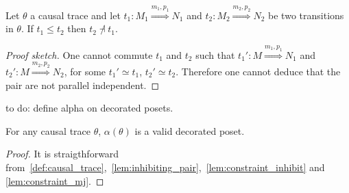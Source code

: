 \begin{lemma}
  \label{lem:constraint_inhibit}
  Let $\theta$ a causal trace and let $t_1:M_1\overset{m_1,p_1}{\Rightarrow}N_1$ and $t_2:M_2\overset{m_2,p_2}{\Rightarrow}N_2$ be two transitions in $\theta$.
  If $t_1 \leq t_2$ then $t_2\not\dashv t_1$.
\end{lemma}
\begin{proof}[Proof sketch]
  One cannot commute $t_1$ and $t_2$ such that $t_1':M\overset{m_1,p_1}{\Rightarrow}N_1$ and $t_2':M\overset{m_2,p_2}{\Rightarrow}N_2$, for some $t_1'\simeq t_1$, $t_2'\simeq t_2$. Therefore one cannot deduce that the pair are not parallel independent.
\end{proof}


\begin{mdframed}[backgroundcolor=blue!20]
to do: define alpha  on decorated posets.
\end{mdframed}

\begin{lemma}
  \label{prop:constraints_poset}
  For any causal trace $\theta$, $\alpha(\theta)$ is a valid decorated poset.
\end{lemma}
\begin{proof}
  It is straigthforward from~\autoref{def:causal_trace},~\autoref{lem:inhibiting_pair},~\autoref{lem:constraint_inhibit} and \autoref{lem:constraint_mj}.
\end{proof}
